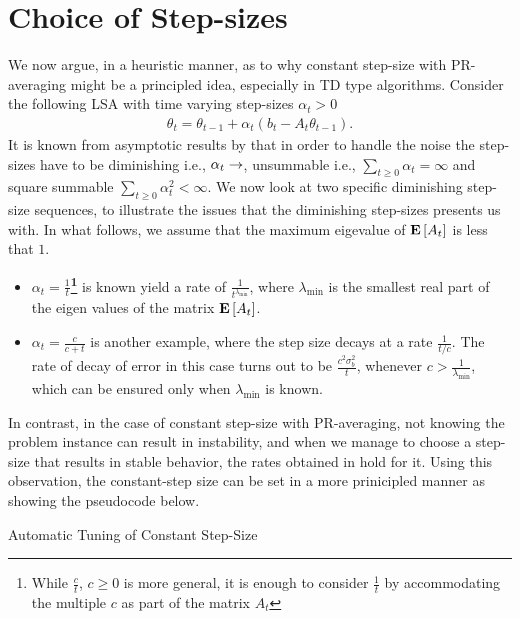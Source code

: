 \section{Choice of Step-sizes}
We now argue, in a heuristic manner, as to why constant step-size with PR-averaging might be a principled idea, especially in TD type algorithms. Consider the following LSA with time varying step-sizes $\alpha_t>0$
\begin{align}
\theta_t=\theta_{t-1}+\alpha_t(b_t-A_t\theta_{t-1}).
\end{align}
It is known from asymptotic results by \cite{borkarbook,kushner} that in order to handle the noise the step-sizes have to be diminishing i.e., $\alpha_t\rightarrow$, unsummable i.e., $\sum_{t \geq 0}\alpha_t=\infty$ and square summable $\sum_{t\geq 0}\alpha_t^2<\infty$. We now look at two specific diminishing step-size sequences, to illustrate the issues that the diminishing step-sizes presents us with. In what follows, we assume that the maximum eigevalue of $\mathbf{E}\left[A_t\right]$ is less that $1$.
\begin{itemize}[leftmargin=*, before = \leavevmode\vspace{-\baselineskip}]
\item \textbf{$\alpha_t=\frac{1}{t}$\footnote{While $\frac{c}{t}$, $c\geq 0$ is more general, it is enough to consider $\frac1t$ by accommodating the multiple $c$ as part of the matrix $A_t$}} is known yield a rate of $\frac{1}{t^{\lambda_{\min}}}$, where $\lambda_{\min}$ is the smallest real part of the eigen values of the matrix $\mathbf{E}\left[A_t\right]$.
\item \textbf{$\alpha_t=\frac{c}{c+t}$} is another example, where the step size decays at a rate $\frac{1}{t/c}$. The rate of decay of error in this case turns out to be $\frac{c^2\sigma_b^2}{t}$, whenever $c>\frac{1}{\lambda_{\min}}$, which can be ensured only when $\lambda_{\min}$ is known.
\end{itemize}
In contrast, in the case of constant step-size with PR-averaging, not knowing the problem instance can result in instability, and when we manage to choose a step-size that results in stable behavior, the rates obtained in  hold for it. Using this observation, the constant-step size can be set in a more prinicipled manner as showing the pseudocode below.
\begin{algorithm}[H]
\caption*{Automatic Tuning of Constant Step-Size}
\begin{algorithmic}[1]
\ENDIF
{}
\ENDIF
\ENDFOR
\end{algorithmic}
\end{algorithm}



